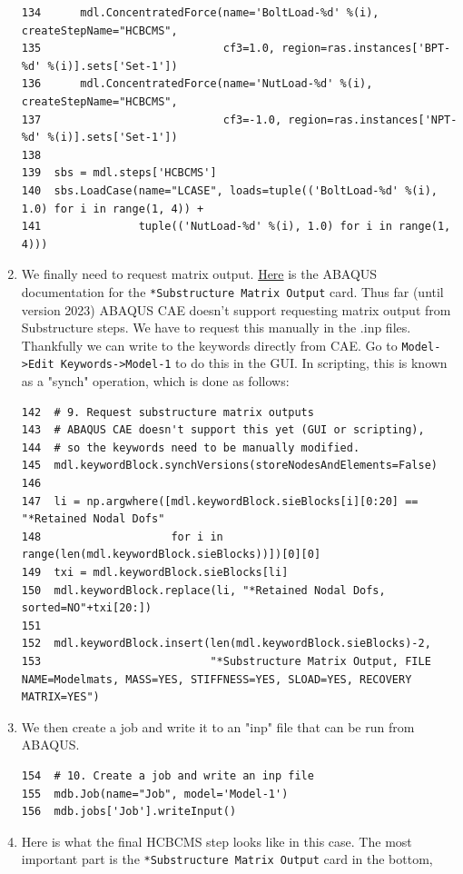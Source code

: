 \documentclass[11pt]{article}
\begin{document}
\begin{enumerate}
\begin{verbatim}
134      mdl.ConcentratedForce(name='BoltLoad-%d' %(i), createStepName="HCBCMS",
135                            cf3=1.0, region=ras.instances['BPT-%d' %(i)].sets['Set-1'])
136      mdl.ConcentratedForce(name='NutLoad-%d' %(i), createStepName="HCBCMS",
137                            cf3=-1.0, region=ras.instances['NPT-%d' %(i)].sets['Set-1'])
138  
139  sbs = mdl.steps['HCBCMS']
140  sbs.LoadCase(name="LCASE", loads=tuple(('BoltLoad-%d' %(i), 1.0) for i in range(1, 4)) +
141               tuple(('NutLoad-%d' %(i), 1.0) for i in range(1, 4)))
\end{verbatim}
\item We finally need to request matrix output.
\href{https://classes.engineering.wustl.edu/2009/spring/mase5513/abaqus/docs/v6.6/books/key/default.htm?startat=ch18abk43.html}{Here} is the ABAQUS documentation for the \texttt{*Substructure Matrix Output} card.
Thus far (until version 2023) ABAQUS CAE doesn't support requesting matrix output from Substructure steps.
We have to request this manually in the .inp files.
Thankfully we can write to the keywords directly from CAE.
Go to \texttt{Model->Edit Keywords->Model-1} to do this in the GUI.
In scripting, this is known as a "synch" operation, which is done as follows:
\begin{verbatim}
142  # 9. Request substructure matrix outputs
143  # ABAQUS CAE doesn't support this yet (GUI or scripting),
144  # so the keywords need to be manually modified.
145  mdl.keywordBlock.synchVersions(storeNodesAndElements=False)
146  
147  li = np.argwhere([mdl.keywordBlock.sieBlocks[i][0:20] == "*Retained Nodal Dofs"
148                    for i in range(len(mdl.keywordBlock.sieBlocks))])[0][0]
149  txi = mdl.keywordBlock.sieBlocks[li]
150  mdl.keywordBlock.replace(li, "*Retained Nodal Dofs, sorted=NO"+txi[20:])
151  
152  mdl.keywordBlock.insert(len(mdl.keywordBlock.sieBlocks)-2, 
153                          "*Substructure Matrix Output, FILE NAME=Modelmats, MASS=YES, STIFFNESS=YES, SLOAD=YES, RECOVERY MATRIX=YES")
\end{verbatim}
\item We then create a job and write it to an "inp" file that can be run from ABAQUS.
\begin{verbatim}
154  # 10. Create a job and write an inp file
155  mdb.Job(name="Job", model='Model-1')
156  mdb.jobs['Job'].writeInput()
\end{verbatim}
\item Here is what the final HCBCMS step looks like in this case.
The most important part is the \texttt{*Substructure Matrix Output} card in the bottom,

\end{enumerate}
\end{document}
